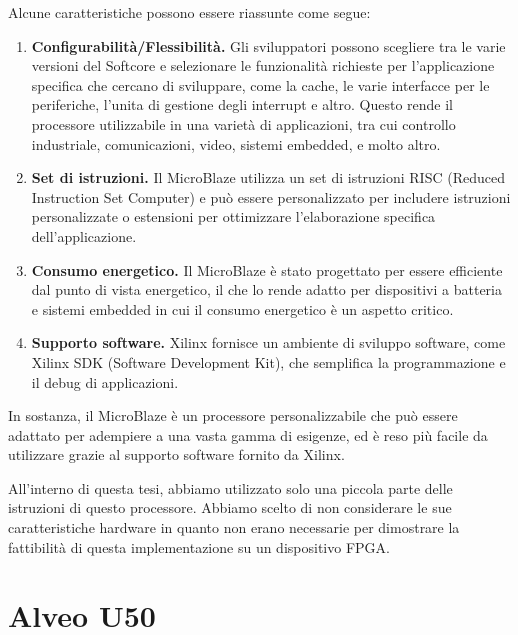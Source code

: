 \vspace{0,5cm}

Alcune caratteristiche possono essere riassunte come segue:  

\begin{enumerate}
    \item \textbf{Configurabilità/Flessibilità.} Gli sviluppatori possono scegliere tra le varie versioni del Softcore e selezionare le funzionalità richieste per l'applicazione specifica che cercano di sviluppare, come la cache, le varie interfacce per le periferiche, l'unita di gestione degli interrupt e altro. Questo rende il processore utilizzabile in una varietà di applicazioni, tra cui controllo industriale, comunicazioni, video, sistemi embedded, e molto altro.
    \item \textbf{Set di istruzioni.} Il MicroBlaze utilizza un set di istruzioni RISC (Reduced Instruction Set Computer) e può essere personalizzato per includere istruzioni personalizzate o estensioni per ottimizzare l'elaborazione specifica dell'applicazione.
    \item \textbf{Consumo energetico.} Il MicroBlaze è stato progettato per essere efficiente dal punto di vista energetico, il che lo rende adatto per dispositivi a batteria e sistemi embedded in cui il consumo energetico è un aspetto critico.
    \item \textbf{Supporto software.} Xilinx fornisce un ambiente di sviluppo software, come Xilinx SDK (Software Development Kit), che semplifica la programmazione e il debug di applicazioni.
\end{enumerate}

\vspace{0,5cm}

In sostanza, il MicroBlaze è un processore personalizzabile che può essere adattato per adempiere a una vasta gamma di esigenze, ed è reso più facile da utilizzare grazie al supporto software fornito da Xilinx.

All'interno di questa tesi, abbiamo utilizzato solo una piccola parte delle istruzioni di questo processore. Abbiamo scelto di non considerare le sue caratteristiche hardware in quanto non erano necessarie per dimostrare la fattibilità di questa implementazione su un dispositivo FPGA.

\clearpage 

\section{Alveo U50}
\label{Alveo}

